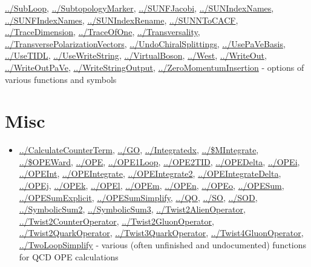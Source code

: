 \documentclass[../FeynCalcManual.tex]{subfiles}
\begin{document}
\begin{itemize}
  \hyperlink{../subloop}{../SubLoop},
  \hyperlink{../subtopologymarker}{../SubtopologyMarker},
  \hyperlink{../sunfjacobi}{../SUNFJacobi},
  \hyperlink{../sunindexnames}{../SUNIndexNames},
  \hyperlink{../sunfindexnames}{../SUNFIndexNames},
  \hyperlink{../sunindexrename}{../SUNIndexRename},
  \hyperlink{../sunntocacf}{../SUNNToCACF},
  \hyperlink{../tracedimension}{../TraceDimension},
  \hyperlink{../traceofone}{../TraceOfOne},
  \hyperlink{../transversality}{../Transversality},
  \hyperlink{../transversepolarizationvectors}{../TransversePolarizationVectors},
  \hyperlink{../undochiralsplittings}{../UndoChiralSplittings},
  \hyperlink{../usepavebasis}{../UsePaVeBasis},
  \hyperlink{../usetidl}{../UseTIDL},
  \hyperlink{../usewritestring}{../UseWriteString},
  \hyperlink{../virtualboson}{../VirtualBoson},
  \hyperlink{../west}{../West}, \hyperlink{../writeout}{../WriteOut},
  \hyperlink{../writeoutpave}{../WriteOutPaVe},
  \hyperlink{../writestringoutput}{../WriteStringOutput},
  \hyperlink{../zeromomentuminsertion}{../ZeroMomentumInsertion} -
  options of various functions and symbols
\end{itemize}

\hypertarget{misc}{
\section{Misc}\label{misc}}

\begin{itemize}
\tightlist
\item
  \hyperlink{../calculatecounterterm}{../CalculateCounterTerm},
  \hyperlink{../go}{../GO}, \hyperlink{../integratedx}{../Integratedx},
  \hyperlink{../dollarmintegrate}{../\$MIntegrate},
  \hyperlink{../dollaropeward}{../\$OPEWard},
  \hyperlink{../ope}{../OPE}, \hyperlink{../ope1loop}{../OPE1Loop},
  \hyperlink{../ope2tid}{../OPE2TID},
  \hyperlink{../opedelta}{../OPEDelta}, \hyperlink{../opei}{../OPEi},
  \hyperlink{../opeint}{../OPEInt},
  \hyperlink{../opeintegrate}{../OPEIntegrate},
  \hyperlink{../opeintegrate2}{../OPEIntegrate2},
  \hyperlink{../opeintegratedelta}{../OPEIntegrateDelta},
  \hyperlink{../opej}{../OPEj}, \hyperlink{../opek}{../OPEk},
  \hyperlink{../opel}{../OPEl}, \hyperlink{../opem}{../OPEm},
  \hyperlink{../open}{../OPEn}, \hyperlink{../opeo}{../OPEo},
  \hyperlink{../opesum}{../OPESum},
  \hyperlink{../opesumexplicit}{../OPESumExplicit},
  \hyperlink{../opesumsimplify}{../OPESumSimplify},
  \hyperlink{../qo}{../QO}, \hyperlink{../so}{../SO},
  \hyperlink{../sod}{../SOD},
  \hyperlink{../symbolicsum2}{../SymbolicSum2},
  \hyperlink{../symbolicsum3}{../SymbolicSum3},
  \hyperlink{../twist2alienoperator}{../Twist2AlienOperator},
  \hyperlink{../twist2counteroperator}{../Twist2CounterOperator},
  \hyperlink{../twist2gluonoperator}{../Twist2GluonOperator},
  \hyperlink{../twist2quarkoperator}{../Twist2QuarkOperator},
  \hyperlink{../twist3quarkoperator}{../Twist3QuarkOperator},
  \hyperlink{../twist4gluonoperator}{../Twist4GluonOperator},
  \hyperlink{../twoloopsimplify}{../TwoLoopSimplify} - various (often
  unfinished and undocumented) functions for QCD OPE calculations
\end{itemize}
\end{document}
